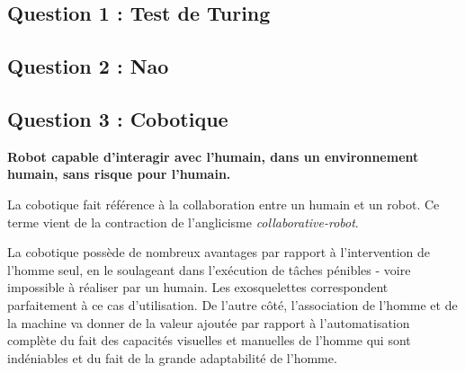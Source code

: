 \subsection{Question 1 : Test de Turing}


\subsection{Question 2 : Nao}

\subsection{Question 3 : Cobotique}

\textbf{Robot capable d'interagir avec l'humain, dans un environnement humain, sans
risque pour l'humain.}

La cobotique fait référence à la collaboration entre un humain et un robot.
Ce terme vient de la contraction de l'anglicisme \emph{collaborative-robot}.

La cobotique possède de nombreux avantages par rapport à l'intervention de
l'homme seul, en le soulageant dans l'exécution de tâches pénibles - voire
impossible à réaliser par un humain. Les exosquelettes correspondent
parfaitement à ce cas d'utilisation.
De l'autre côté, l'association de l'homme et de la machine va donner de la
valeur ajoutée par rapport à l'automatisation complète du fait des capacités
visuelles et manuelles de l'homme qui sont indéniables et du fait de la grande
adaptabilité de l'homme.
